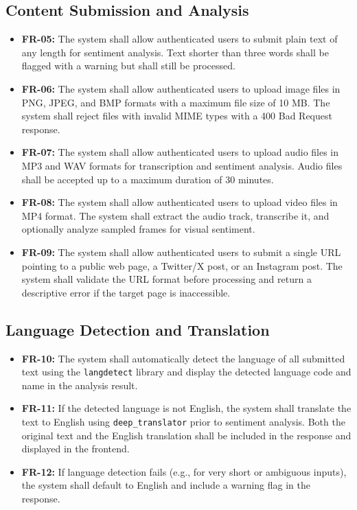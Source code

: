 \documentclass[12pt, a4paper]{report}
\begin{document}
\subsection{Content Submission and Analysis}

\begin{itemize}[noitemsep, leftmargin=2em]
    \item \textbf{FR-05:} The system shall allow authenticated users to submit plain text of any length for sentiment analysis. Text shorter than three words shall be flagged with a warning but shall still be processed.
    \item \textbf{FR-06:} The system shall allow authenticated users to upload image files in PNG, JPEG, and BMP formats with a maximum file size of 10 MB. The system shall reject files with invalid MIME types with a 400 Bad Request response.
    \item \textbf{FR-07:} The system shall allow authenticated users to upload audio files in MP3 and WAV formats for transcription and sentiment analysis. Audio files shall be accepted up to a maximum duration of 30 minutes.
    \item \textbf{FR-08:} The system shall allow authenticated users to upload video files in MP4 format. The system shall extract the audio track, transcribe it, and optionally analyze sampled frames for visual sentiment.
    \item \textbf{FR-09:} The system shall allow authenticated users to submit a single URL pointing to a public web page, a Twitter/X post, or an Instagram post. The system shall validate the URL format before processing and return a descriptive error if the target page is inaccessible.
\end{itemize}

\subsection{Language Detection and Translation}

\begin{itemize}[noitemsep, leftmargin=2em]
    \item \textbf{FR-10:} The system shall automatically detect the language of all submitted text using the \texttt{langdetect} library and display the detected language code and name in the analysis result.
    \item \textbf{FR-11:} If the detected language is not English, the system shall translate the text to English using \texttt{deep\_translator} prior to sentiment analysis. Both the original text and the English translation shall be included in the response and displayed in the frontend.
    \item \textbf{FR-12:} If language detection fails (e.g., for very short or ambiguous inputs), the system shall default to English and include a warning flag in the response.
\end{itemize}
\end{document}
